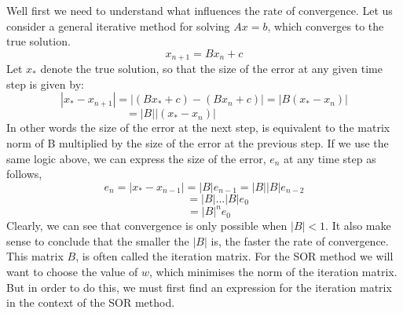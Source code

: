 \documentclass[11pt]{article}
\begin{document}
Well first we need to understand what influences the rate of convergence.
Let us consider a general iterative method for solving $Ax = b$, which converges to the true solution.
\begin{equation}
    x_{n+1} = Bx_n + c
\end{equation}
Let $x_{*}$ denote the true solution, so that
the size of the error at any given time step is given by:
\begin{equation*}
   |x_{*}-x_{n+1}| = |(Bx_{*}+c)-(Bx_{n}+c)|
     =|B(x_{*}-x_{n})|
\end{equation*}
\begin{equation*}
    = |B||(x_{*}-x_{n})|\phantom{ccccccccccccc,}
\end{equation*}
In other words the size of the error at the next step, is equivalent to the matrix norm of B multiplied by the size of the error at the previous step.
If we use the same logic above, we can express the size of the error, $e_n$ at any time step as follows,
\begin{equation*}
    e_{n}= |x_{*}-x_{n-1}|
    = |B|e_{n-1}
    = |B||B|e_{n-2}
\end{equation*}
\begin{equation*}
    \phantom{ccccc.}= |B|...|B|e_{0}
\end{equation*}
\begin{equation*}
    \phantom{cc}= |B|^ne_0
\end{equation*}
Clearly, we can see that convergence is only possible when $|B|<1$. It also make sense to conclude that the smaller the $|B|$ is, the faster the rate of convergence. This matrix $B$, is often called the iteration matrix. For the SOR method we will want to choose the value of $w$, which minimises the norm of the iteration matrix. But in order to do this, we must first find an expression for the iteration matrix in the context of the SOR method.
\end{document}
